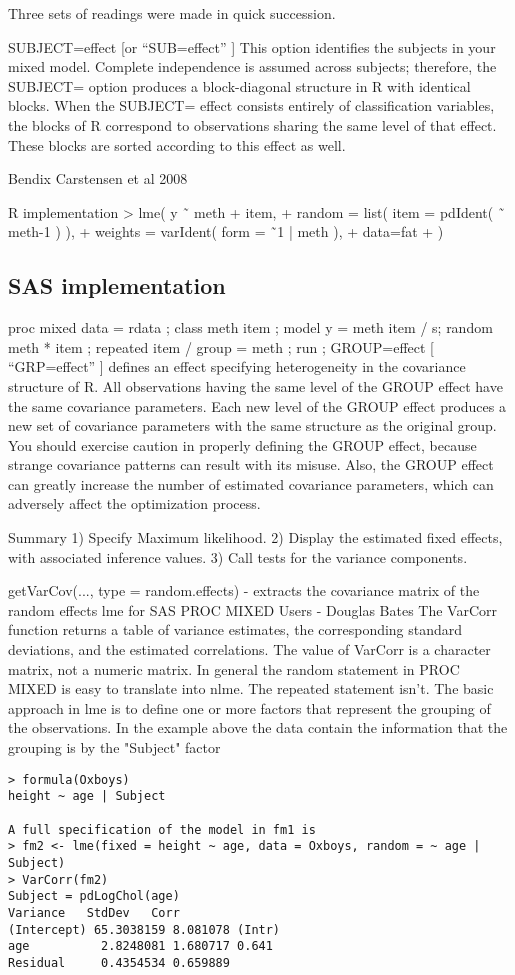 Three sets of readings were made in quick succession.



SUBJECT=effect 	[or “SUB=effect” ]
This option identifies the subjects in your mixed model. 
Complete independence is assumed across subjects; therefore, the SUBJECT= option produces a block-diagonal structure in R with identical blocks. 
When the SUBJECT= effect consists entirely of classification variables, the blocks of  R correspond to observations sharing the same level of that effect. 
These blocks are sorted according to this effect as well. 






Bendix Carstensen et al 2008

R implementation
> lme( y ˜ meth + item,
+ random = list( item = pdIdent( ˜ meth-1 ) ),
+ weights = varIdent( form = ˜1 | meth ),
+ data=fat
+ )
\subsection*{SAS implementation}

proc mixed data = rdata ;
class meth item ;
model y = meth item / s;
random meth * item ;
repeated item / group = meth ;
run ;
GROUP=effect	[ “GRP=effect” ]
defines an effect specifying heterogeneity in the covariance structure of R. 
All observations having the same level of the GROUP effect have the same covariance parameters. 
Each new level of the GROUP effect produces a new set of covariance parameters with the same structure as the original group. 
You should exercise caution in properly defining the GROUP effect, because strange covariance patterns can result with its misuse. Also, the GROUP effect can greatly increase the number of estimated covariance parameters, which can adversely affect the optimization process. 

Summary  
1)	Specify Maximum likelihood.
2)	Display the estimated fixed effects, with associated inference values.
3)	Call tests for the variance components.

getVarCov(..., type = random.effects) - extracts the covariance matrix of the random effects
lme for SAS PROC MIXED Users - Douglas Bates
The VarCorr function returns a table of variance estimates, the
corresponding standard deviations, and the estimated correlations.
The value of VarCorr is a character matrix, not a numeric matrix. 
In general the random statement in PROC MIXED is
easy to translate into nlme.  The repeated statement isn't.
The basic approach in lme is to define one or more factors that represent the grouping of the observations.  In the example above the data contain the information that the grouping is by the "Subject"
factor
\begin{verbatim}
> formula(Oxboys)
height ~ age | Subject

A full specification of the model in fm1 is
> fm2 <- lme(fixed = height ~ age, data = Oxboys, random = ~ age | Subject)
> VarCorr(fm2)
Subject = pdLogChol(age) 
Variance   StdDev   Corr  
(Intercept) 65.3038159 8.081078 (Intr)
age          2.8248081 1.680717 0.641 
Residual     0.4354534 0.659889   

\end{verbatim}


